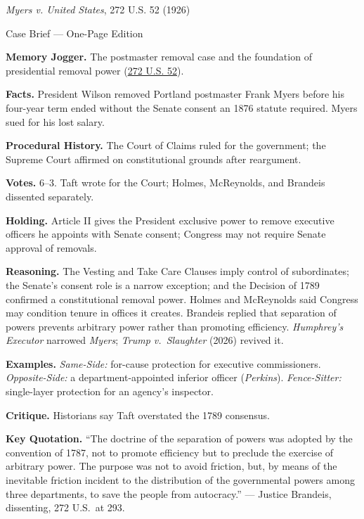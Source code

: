 \documentclass[12pt]{article}
\begin{document}
\begin{center}
{\Large \textit{Myers v. United States}, 272 U.S. 52 (1926)\par}
\vspace{0.3em}
{\normalsize Case Brief --- One-Page Edition\par}
\end{center}

\textbf{Memory Jogger.} The postmaster removal case and the foundation of presidential removal power (\href{https://supreme.justia.com/cases/federal/us/272/52/}{272 U.S. 52}).

\textbf{Facts.} President Wilson removed Portland postmaster Frank Myers before his four-year term ended without the Senate consent an 1876 statute required. Myers sued for his lost salary.

\textbf{Procedural History.} The Court of Claims ruled for the government; the Supreme Court affirmed on constitutional grounds after reargument.

\textbf{Votes.} 6--3. Taft wrote for the Court; Holmes, McReynolds, and Brandeis dissented separately.

\textbf{Holding.} Article II gives the President exclusive power to remove executive officers he appoints with Senate consent; Congress may not require Senate approval of removals.

\textbf{Reasoning.} The Vesting and Take Care Clauses imply control of subordinates; the Senate's consent role is a narrow exception; and the Decision of 1789 confirmed a constitutional removal power. Holmes and McReynolds said Congress may condition tenure in offices it creates. Brandeis replied that separation of powers prevents arbitrary power rather than promoting efficiency. \textit{Humphrey's Executor} narrowed \textit{Myers}; \textit{Trump v.\ Slaughter} (2026) revived it.

\textbf{Examples.} \emph{Same-Side:} for-cause protection for executive commissioners. \emph{Opposite-Side:} a department-appointed inferior officer (\textit{Perkins}). \emph{Fence-Sitter:} single-layer protection for an agency's inspector.

\textbf{Critique.} Historians say Taft overstated the 1789 consensus.

\textbf{Key Quotation.} ``The doctrine of the separation of powers was adopted by the convention of 1787, not to promote efficiency but to preclude the exercise of arbitrary power. The purpose was not to avoid friction, but, by means of the inevitable friction incident to the distribution of the governmental powers among three departments, to save the people from autocracy.'' --- Justice Brandeis, dissenting, 272 U.S.\ at 293.
\end{document}
